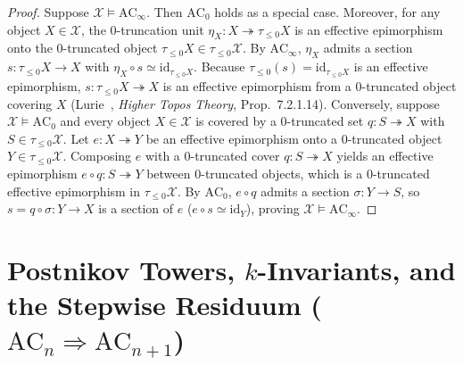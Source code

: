 \documentclass[10pt,twoside,openright]{book}
\theoremstyle{crmplain}
\theoremstyle{crmdef}
\theoremstyle{crmremark}
\begin{document}
\begin{proof}
Suppose $\mathcal{X} \models \mathrm{AC}_\infty$. Then $\mathrm{AC}_0$ holds as a special case. Moreover, for any object $X \in \mathcal{X}$, the $0$-truncation unit $\eta_X: X \twoheadrightarrow \tau_{\le 0}X$ is an effective epimorphism onto the $0$-truncated object $\tau_{\le 0}X \in \tau_{\le 0}\mathcal{X}$. By $\mathrm{AC}_\infty$, $\eta_X$ admits a section $s: \tau_{\le 0}X \to X$ with $\eta_X \circ s \simeq \mathrm{id}_{\tau_{\le 0}X}$. Because $\tau_{\le 0}(s) = \mathrm{id}_{\tau_{\le 0}X}$ is an effective epimorphism, $s: \tau_{\le 0}X \twoheadrightarrow X$ is an effective epimorphism from a $0$-truncated object covering $X$ (Lurie~\cite{Lurie09}, \emph{Higher Topos Theory}, Prop.~7.2.1.14). Conversely, suppose $\mathcal{X} \models \mathrm{AC}_0$ and every object $X \in \mathcal{X}$ is covered by a $0$-truncated set $q: S \twoheadrightarrow X$ with $S \in \tau_{\le 0}\mathcal{X}$. Let $e: X \twoheadrightarrow Y$ be an effective epimorphism onto a $0$-truncated object $Y \in \tau_{\le 0}\mathcal{X}$. Composing $e$ with a $0$-truncated cover $q: S \twoheadrightarrow X$ yields an effective epimorphism $e \circ q: S \twoheadrightarrow Y$ between $0$-truncated objects, which is a $0$-truncated effective epimorphism in $\tau_{\le 0}\mathcal{X}$. By $\mathrm{AC}_0$, $e \circ q$ admits a section $\sigma: Y \to S$, so $s = q \circ \sigma: Y \to X$ is a section of $e$ ($e \circ s \simeq \mathrm{id}_Y$), proving $\mathcal{X} \models \mathrm{AC}_\infty$.
\end{proof}

\section{\texorpdfstring{Postnikov Towers, $k$-Invariants, and the Stepwise Residuum ($\mathrm{AC}_n \Rightarrow \mathrm{AC}_{n+1}$)}{Postnikov Towers, k-Invariants, and the Stepwise Residuum (ACn => ACn+1)}}\label{sec:postnikov-residuum}
\end{document}
